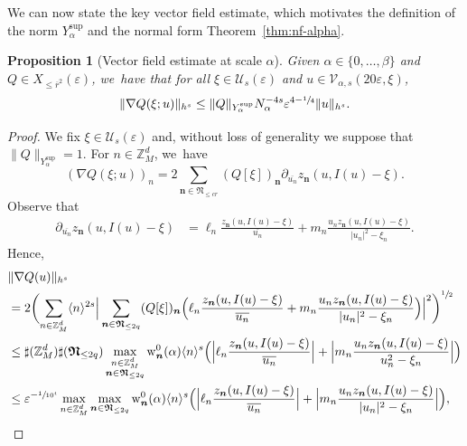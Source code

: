 \documentclass[JEP,XML,SOM,Unicode,published]{cedram}
\theoremstyle{plain}
\newtheorem{proposition}[theorem]{Proposition}
\theoremstyle{definition}
\newcommand{\nb}{{\boldsymbol n}}
\newcommand{\Nb}{{\boldsymbol{\mathfrak{N}}}}
\newcommand{\Z}{\mathbb{Z}}
\newcommand{\1}{\mathbf{1}}
\newcommand{\Ysup}[1]{Y_{#1}^{\mathrm{sup}}}
\let\epsilon\varepsilon
\begin{document}
We can now state the key vector field estimate, which motivates the definition of the norm $\Ysup{\alpha}$ and the normal form Theorem~\ref{thm:nf-alpha}.

\begin{proposition}[Vector field estimate at scale $\alpha$]\label{prop:vec-alpha}
Given $\alpha\in\{0,\dots,\beta\}$ and $Q\in X_{\leq\overline{r}^{2}}(\epsilon)$, we~have that for all $\xi\in\mathcal{U}_{s}(\epsilon)$
and $u\in\mathcal{V}_{\alpha,s}(20\epsilon,\xi)$,
\begin{equation}
\label{eq:vec-alpha}
\|\nabla Q(\xi;u)\|_{h^{s}}\leq \|Q\|_{\Ysup{\alpha}} N_{\alpha}^{-4s}\epsilon^{4-\sfrac{1}{4}}\|u\|_{h^{s}}.
\end{equation}
\end{proposition}

\begin{proof} We fix $\xi\!\in\!\mathcal{U}_{s}(\epsilon)$ and, without loss of generality we suppose that \hbox{$\|Q\|_{\Ysup{\alpha}}\!=\!1$}. For $n\in\Z_{M}^{d}$, we~have
\[
(\nabla Q(\xi;u))_{n} = 2\sum_{\nb\in\Nb_{\leq cr}}(Q[\xi])_{\nb}\partial_{\overline{u_{n}}}z_{\nb}(u,I(u)-\xi).
\]
Observe that
\begin{align*}
\partial_{\overline{u_{n}}}z_{\nb}(u,I(u)-\xi)
&= \ell_{n}\frac{z_{\nb}(u,I(u)-\xi)}{\overline{u_{n}}} + m_{n}\frac{u_{n}z_{\nb}(u,I(u)-\xi)}{|u_{n}|^{2}-\xi_{n}}.
\end{align*}
Hence,
\begin{equation*}
\begin{split}
&\|\nabla Q(u)\|_{h^{s}}\\
&= 2\biggl(\sum_{n\in\Z_{M}^{d}}\langle n\rangle^{2s}\Big|\sum_{\nb\in\Nb_{\leq 2q}}(Q[\xi])_{\nb}\Big(\ell_{n}\frac{z_{\nb}(u,I(u)-\xi)}{\overline{u_{n}}}+m_{n}\frac{u_{n}z_{\nb}(u,I(u)-\xi)}{|u_{n}|^{2}-\xi_{n}}\Big)\Big|^{2}\biggr)^{\sfrac{1}{2}} \\
&\leq \sharp(\Z_{M}^{d})\sharp(\Nb_{\leq2q})\max_{\substack{n\in\Z_{M}^{d}\\ \nb\in\Nb_{\leq 2q}}}
\operatorname{w}_{\nb}^{0}(\alpha)\langle n\rangle^{s}
\Big(\Bigl|\ell_{n}\frac{z_{\nb}(u,I(u)-\xi)}{\overline{u_{n}}}\Bigr|+\Bigl|m_{n}\frac{u_{n}z_{\nb}(u,I(u)-\xi)}{u_{n}^{2}-\xi_{n}}\Bigr|
\Big) \\
&\leq \epsilon^{-\sfrac{1}{10^{4}}}\max_{n\in\Z_{M}^{d}}
\max_{\nb\in\Nb_{\leq2q}}
\operatorname{w}_{\nb}^{0}(\alpha)\langle n\rangle^{s}\Big(\Bigl|\ell_{n}\frac{z_{\nb}(u,I(u)-\xi)}{\overline{u_{n}}}\Bigr|+\Bigl|m_{n}\frac{u_{n}z_{\nb}(u,I(u)-\xi)}{|u_n|^{2}-\xi_{n}}\Bigr|\Big),

\end{split}
\end{equation*}
\end{proof}
\end{document}
